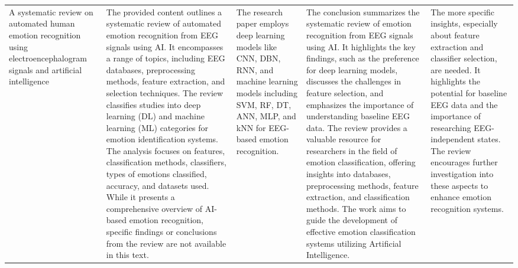 \documentclass[conference]{IEEEtran}
\begin{document}
\begin{longtable}
\begin{tabularx}{\textwidth}{|>{\raggedright\arraybackslash}X|>{\raggedright\arraybackslash}X|>{\raggedright\arraybackslash}X|>{\raggedright\arraybackslash}X|>{\raggedright\arraybackslash}X|}
\hline  
A systematic review on automated human emotion recognition using electroencephalogram signals and artificial intelligence &The provided content outlines a systematic review of automated emotion recognition from EEG signals using AI. It encompasses a range of topics, including EEG databases, preprocessing methods, feature extraction, and selection techniques. The review classifies studies into deep learning (DL) and machine learning (ML) categories for emotion identification systems. The analysis focuses on features, classification methods, classifiers, types of emotions classified, accuracy, and datasets used. While it presents a comprehensive overview of AI-based emotion recognition, specific findings or conclusions from the review are not available in this text. &The research paper employs deep learning models like CNN, DBN, RNN, and machine learning models including SVM, RF, DT, ANN, MLP, and kNN for EEG-based emotion recognition.&The conclusion summarizes the systematic review of emotion recognition from EEG signals using AI. It highlights the key findings, such as the preference for deep learning models, discusses the challenges in feature selection, and emphasizes the importance of understanding baseline EEG data. The review provides a valuable resource for researchers in the field of emotion classification, offering insights into databases, preprocessing methods, feature extraction, and classification methods. The work aims to guide the development of effective emotion classification systems utilizing Artificial Intelligence.&The more specific insights, especially about feature extraction and classifier selection, are needed. It highlights the potential for baseline EEG data and the importance of researching EEG-independent states. The review encourages further investigation into these aspects to enhance emotion recognition systems.  \\


\end{tabularx}
\end{longtable}
\end{document}
